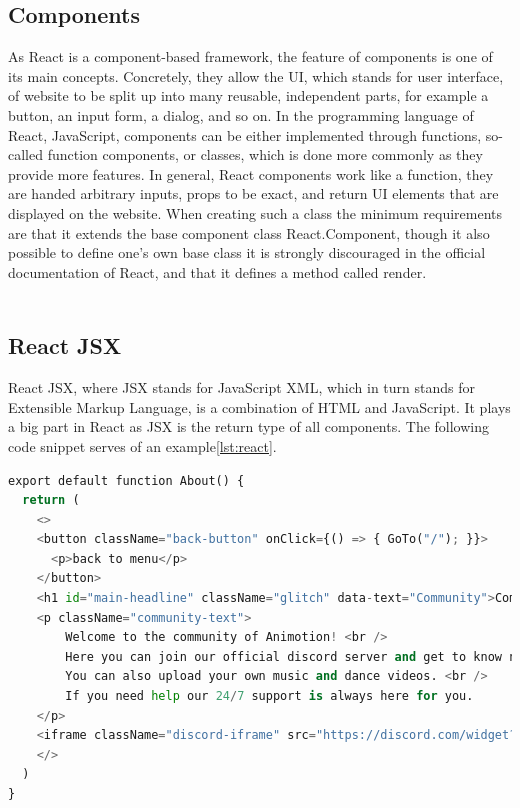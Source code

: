 \subsection{Components}
As React is a component-based framework, the feature of components is one of its main concepts. Concretely, they
allow the UI, which stands for user interface, of website to be split up into many reusable, independent parts,
for example a button, an input form, a dialog, and so on. In the programming language of React, JavaScript,
components can be either implemented through functions, so-called function components, or classes, which is done 
more commonly as they provide more features. In general, React components work like a function, they are handed 
arbitrary inputs, props to be exact, and return UI elements that are displayed on the website. When creating 
such a class the minimum requirements are that it extends the base component class React.Component, though it 
also possible to define one's own base class it is strongly discouraged in the official documentation of React,
and that it defines a method called render. \cite{ReactComponentProps} \cite{ReactComponent}
\\
\\
\subsection{React JSX}
React JSX, where JSX stands for JavaScript XML, which in turn stands for Extensible Markup Language, is a combination
of HTML and JavaScript. It plays a big part in React as JSX is the return type of all components. The following 
code snippet serves of an example\ref{lst:react}.

\begin{lstlisting}[language=Python,caption=Example of a react component,label=lst:react]
  export default function About() {
  return (
    <>
    <button className="back-button" onClick={() => { GoTo("/"); }}>
      <p>back to menu</p>
    </button>
    <h1 id="main-headline" className="glitch" data-text="Community">Community</h1>
    <p className="community-text">
        Welcome to the community of Animotion! <br />
        Here you can join our official discord server and get to know new people. <br />
        You can also upload your own music and dance videos. <br />
        If you need help our 24/7 support is always here for you.
    </p>
    <iframe className="discord-iframe" src="https://discord.com/widget?id=1035647726634934382&theme=dark" allowtransparency="true" frameBorder="0" sandbox="allow-popups allow-popups-to-escape-sandbox allow-same-origin allow-scripts"></iframe>
    </>
  )
}
\end{lstlisting}

